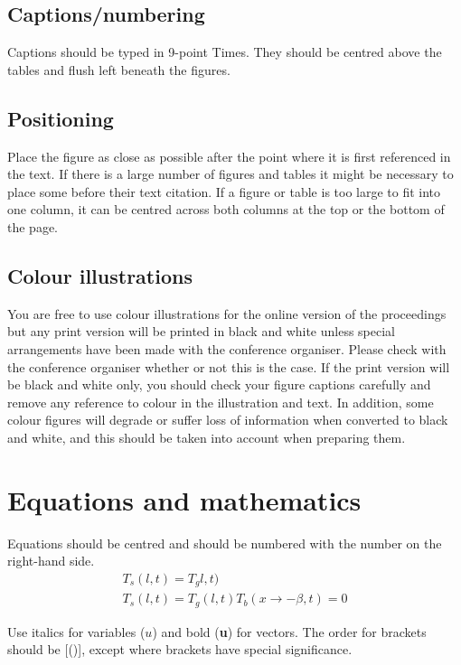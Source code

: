 \documentclass[twocolumn]{webofc}
\begin{document}
\subsection{Captions/numbering}\label{sec:cap-num}
Captions should be typed in 9-point Times. They should be centred above the tables and flush left beneath the figures.
\subsection{Positioning}\label{sec:positioning}
Place the figure as close as possible after the point where it is first referenced in the text. If there is a large number of figures and tables it might be necessary to place some before their text citation. If a figure or table is too large to fit into one column, it can be centred across both columns at the top or the bottom of the page.

\subsection{Colour illustrations}\label{sec:colour-illustrations}
You are free to use colour illustrations for the online version of the proceedings but any print version will be printed in black and white unless special arrangements have been made with the conference organiser.
Please check with the conference organiser whether or not this is the case.
If the print version will be black and white only, you should check your figure captions carefully and remove any reference to colour in the illustration and text.
In addition, some colour figures will degrade or suffer loss of information when converted to black and white, and this should be taken into account when preparing them.
\vspace{1.5\baselineskip}
\section{Equations and mathematics}\label{sec:equat-math}
Equations should be centred and should be numbered with the number on the right-hand side.
\begin{gather}
  T_{s}(l,t) = T_{g}l,t)\label{eq:1}\\
  T_{s}(l,t) = T_{g}(l,t)T_{b}(x \rightarrow -\beta, t) = 0\label{eq:2}
\end{gather}

Use italics for variables ($u$) and bold (\textbf{u}) for vectors.
The order for brackets should be {[()]}, except where brackets have special significance. 
\end{document}
